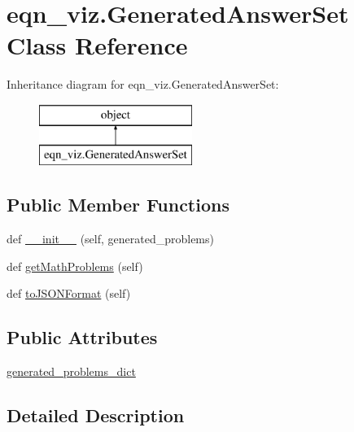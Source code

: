 \hypertarget{classeqn__viz_1_1_generated_answer_set}{}\section{eqn\+\_\+viz.\+Generated\+Answer\+Set Class Reference}
\label{classeqn__viz_1_1_generated_answer_set}
Inheritance diagram for eqn\+\_\+viz.\+Generated\+Answer\+Set\+:\begin{figure}[H]
\begin{center}
\leavevmode
\includegraphics[height=2.000000cm]{classeqn__viz_1_1_generated_answer_set}
\end{center}
\end{figure}
\subsection*{Public Member Functions}
\begin{DoxyCompactItemize}
\item 
def \hyperlink{classeqn__viz_1_1_generated_answer_set_a3c05f96507e0e04c357e5bb5258d73fb}{\+\_\+\+\_\+init\+\_\+\+\_\+} (self, generated\+\_\+problems)
\item 
def \hyperlink{classeqn__viz_1_1_generated_answer_set_af10cd308ec2cceff4527854bea5fabb0}{get\+Math\+Problems} (self)
\item 
def \hyperlink{classeqn__viz_1_1_generated_answer_set_af0dde3d37bfb33361cb67db1cb7ba452}{to\+J\+S\+O\+N\+Format} (self)
\end{DoxyCompactItemize}
\subsection*{Public Attributes}
\begin{DoxyCompactItemize}
\item 
\hyperlink{classeqn__viz_1_1_generated_answer_set_acbdcff75642ae1eab5a35c6bb29a2a21}{generated\+\_\+problems\+\_\+dict}
\end{DoxyCompactItemize}


\subsection{Detailed Description}



